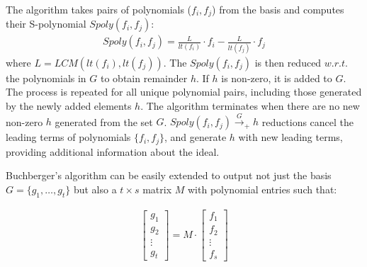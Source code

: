 The algorithm
takes pairs of polynomials ($f_i,f_j$) from the basis and computes
their S-polynomial $Spoly(f_i,f_j)$:
\begin{equation}
\label{spoly}
\begin{split}
Spoly(f_i,f_j) = \frac{L}{lt(f_i)}\cdot f_i - \frac{L}{lt(f_j)}\cdot f_j
\end{split}
\end{equation}
where $L = LCM(lt(f_i),lt(f_j))$. The $Spoly(f_i,f_j)$ is then reduced
$w.r.t.$ the polynomials in $G$ to obtain remainder $h$. If $h$ is
non-zero, it is added to $G$. The process is repeated for all unique
polynomial pairs, including those generated by the newly added
elements $h$. The algorithm terminates when there are no new non-zero
$h$ generated from the set $G$. $Spoly(f_i,f_j)\xrightarrow{G}_+h$
reductions cancel the leading terms of polynomials $\{f_i,f_j\}$, and
generate $h$ with new leading terms, providing additional
information about the ideal.  



Buchberger's algorithm can be easily extended to output 
not just the \Grobner basis $G=\{g_1,\dots,g_t\}$ but also a $t\times
s$ matrix $M$ with polynomial entries such that:

\begin{center}
\begin{align}\label{eqn:matrix}
\begin{bmatrix} g_1 \\ g_2 \\ \vdots \\ g_t \end{bmatrix} =  M \cdot
\begin{bmatrix} f_1 \\ f_2 \\ \vdots \\ f_s \end{bmatrix}
\end{align}
\end{center}

